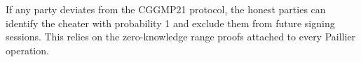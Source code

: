 \begin{theorem}
If any party deviates from the CGGMP21 protocol, the honest parties can
identify the cheater with probability 1 and exclude them from future signing
sessions. This relies on the zero-knowledge range proofs attached to every
Paillier operation.
\end{theorem}

